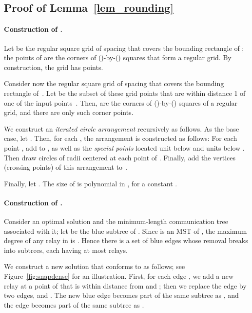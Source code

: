 \documentclass[11pt,a4paper]{article}
\theoremstyle{definition}
\theoremstyle{remark}
\begin{document}
\begin{enumerate}
\subsection{Proof of Lemma~\ref{lem_rounding}}\label{sec_lem_rounding}

\paragraph{\boldmath Construction of .}


Let  be the regular square grid of spacing  that
covers the bounding rectangle of ; the points of  are
the corners of ()-by-() squares that form a regular grid.
By construction, the grid  has  points.

Consider now the regular square grid of spacing  that covers the
bounding rectangle of~.  Let  be the subset of these
grid points that are within distance 1 of one of the  input points~.
Then,  are the corners of ()-by-() squares
of a regular grid, and there are only  such corner points.

We construct an \emph{iterated circle arrangement}  recursively as follows. As the base case, let . Then, for each , the arrangement  is constructed as follows: For each point , add  to , as well as the \emph{special points} located  unit below  and  units below . Then draw circles of radii  centered at each point of . Finally, add the vertices (crossing points) of this arrangement to~.

Finally, let . The size of  is polynomial in , for a constant .

\paragraph{\boldmath Construction of .}

Consider an optimal solution  and the minimum-length communication tree  associated with it; let  be the blue subtree of . Since  is an MST of , the maximum degree of any relay in  is . Hence there is a set  of  blue edges whose removal breaks  into subtrees, each having at most  relays.

We construct a new solution  that conforms to  as follows; see Figure~\ref{fig:snapdense} for an illustration. First, for each edge , we add a new relay  at a point of  that is within distance  from  and ; then we replace the edge  by two edges,  and . The new blue edge  becomes part of the same subtree as , and the edge  becomes part of the same subtree as .


\end{enumerate}
\end{document}
